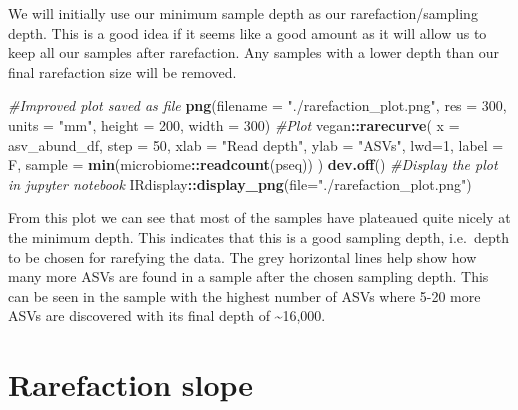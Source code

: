 \documentclass[
]{book}
\newenvironment{Shaded}{\begin{snugshade}}{\end{snugshade}}
\newcommand{\AttributeTok}[1]{\textcolor[rgb]{0.13,0.29,0.53}{#1}}
\newcommand{\CommentTok}[1]{\textcolor[rgb]{0.56,0.35,0.01}{\textit{#1}}}
\newcommand{\DecValTok}[1]{\textcolor[rgb]{0.00,0.00,0.81}{#1}}
\newcommand{\FunctionTok}[1]{\textcolor[rgb]{0.13,0.29,0.53}{\textbf{#1}}}
\newcommand{\NormalTok}[1]{#1}
\newcommand{\SpecialCharTok}[1]{\textcolor[rgb]{0.81,0.36,0.00}{\textbf{#1}}}
\newcommand{\StringTok}[1]{\textcolor[rgb]{0.31,0.60,0.02}{#1}}
\begin{document}
We will initially use our minimum sample depth as our rarefaction/sampling depth.
This is a good idea if it seems like a good amount as it will allow us to keep all our samples after rarefaction.
Any samples with a lower depth than our final rarefaction size will be removed.

\begin{Shaded}
\begin{Highlighting}[]
\CommentTok{\#Improved plot saved as file}
\FunctionTok{png}\NormalTok{(}\AttributeTok{filename =} \StringTok{"./rarefaction\_plot.png"}\NormalTok{, }\AttributeTok{res =} \DecValTok{300}\NormalTok{,}
    \AttributeTok{units =} \StringTok{"mm"}\NormalTok{, }\AttributeTok{height =} \DecValTok{200}\NormalTok{, }\AttributeTok{width =} \DecValTok{300}\NormalTok{)}
\CommentTok{\#Plot}
\NormalTok{vegan}\SpecialCharTok{::}\FunctionTok{rarecurve}\NormalTok{(}
  \AttributeTok{x =}\NormalTok{ asv\_abund\_df, }\AttributeTok{step =} \DecValTok{50}\NormalTok{,}
  \AttributeTok{xlab =} \StringTok{"Read depth"}\NormalTok{, }\AttributeTok{ylab =} \StringTok{"ASVs"}\NormalTok{, }\AttributeTok{lwd=}\DecValTok{1}\NormalTok{, }\AttributeTok{label =}\NormalTok{ F,}
  \AttributeTok{sample =} \FunctionTok{min}\NormalTok{(microbiome}\SpecialCharTok{::}\FunctionTok{readcount}\NormalTok{(pseq))}
\NormalTok{)}
\FunctionTok{dev.off}\NormalTok{()}
\CommentTok{\#Display the plot in jupyter notebook}
\NormalTok{IRdisplay}\SpecialCharTok{::}\FunctionTok{display\_png}\NormalTok{(}\AttributeTok{file=}\StringTok{"./rarefaction\_plot.png"}\NormalTok{)}
\end{Highlighting}
\end{Shaded}

From this plot we can see that most of the samples have plateaued quite nicely at the minimum depth.
This indicates that this is a good sampling depth, i.e.~depth to be chosen for rarefying the data.
The grey horizontal lines help show how many more ASVs are found in a sample after the chosen sampling depth.
This can be seen in the sample with the highest number of ASVs where 5-20 more ASVs are discovered with its final depth of \textasciitilde16,000.

\hypertarget{rarefaction-slope}{%
\section{Rarefaction slope}\label{rarefaction-slope}}
\end{document}
